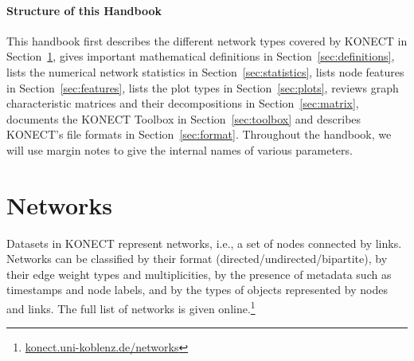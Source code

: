 \documentclass{article}
\begin{document}
\paragraph{Structure of this Handbook}
This handbook first 
describes the different network types covered by KONECT in
Section~\ref{sec:taxonomy}, 
gives important mathematical definitions in
Section~\ref{sec:definitions},  
lists the numerical network statistics in Section~\ref{sec:statistics},
lists node features in Section~\ref{sec:features},
lists the plot types in Section~\ref{sec:plots}, 
reviews graph characteristic matrices and their decompositions in
Section~\ref{sec:matrix},  
documents the KONECT Toolbox in
Section~\ref{sec:toolbox} and
describes KONECT's file formats in Section~\ref{sec:format}. 
Throughout the handbook, we will use margin notes to give the internal
names of various parameters. 

\section{Networks}
\label{sec:taxonomy}
Datasets in KONECT represent networks, i.e., a set of nodes connected by
links. Networks can be classified by their format
(directed/undirected/bipartite), by their edge weight types and
multiplicities, by the 
presence of metadata such as timestamps and node labels, and by
the types of objects represented by nodes and links. 
The full list of networks is given online.\footnote{\href{http://konect.uni-koblenz.de/networks/}{konect.uni-koblenz.de/networks}}
\end{document}
